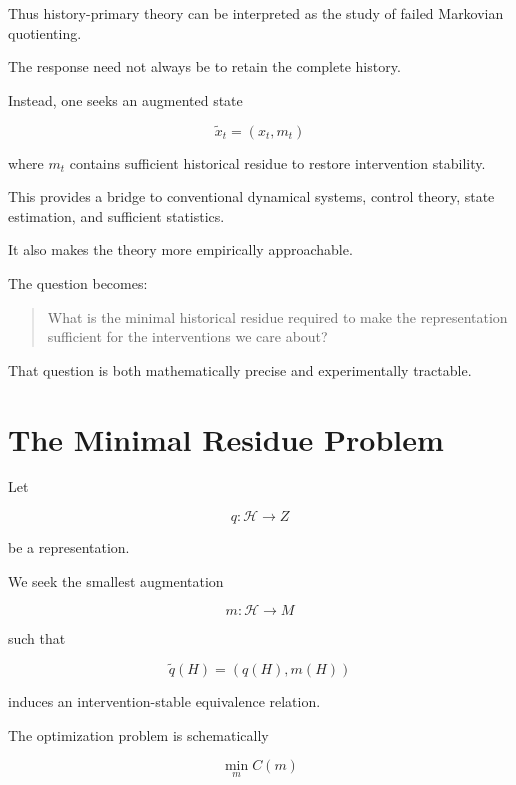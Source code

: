 \documentclass[11pt]{article}
\theoremstyle{remark}
\begin{document}
Thus history-primary theory can be interpreted as the study of failed Markovian quotienting.

The response need not always be to retain the complete history.

Instead, one seeks an augmented state

\begin{equation}
\tilde{x}_t
=
(x_t,m_t)
\end{equation}

where $m_t$ contains sufficient historical residue to restore intervention stability.

This provides a bridge to conventional dynamical systems, control theory, state estimation, and sufficient statistics.

It also makes the theory more empirically approachable.

The question becomes:

\begin{quote}
What is the minimal historical residue required to make the representation sufficient for the interventions we care about?
\end{quote}

That question is both mathematically precise and experimentally tractable.

\section{The Minimal Residue Problem}

Let

\begin{equation}
q:\mathcal{H}\rightarrow Z
\end{equation}

be a representation.

We seek the smallest augmentation

\begin{equation}
m:\mathcal{H}\rightarrow M
\end{equation}

such that

\begin{equation}
\tilde{q}(H)
=
(q(H),m(H))
\end{equation}

induces an intervention-stable equivalence relation.

The optimization problem is schematically

\begin{equation}
\min_m
C(m)
\end{equation}
\end{document}
